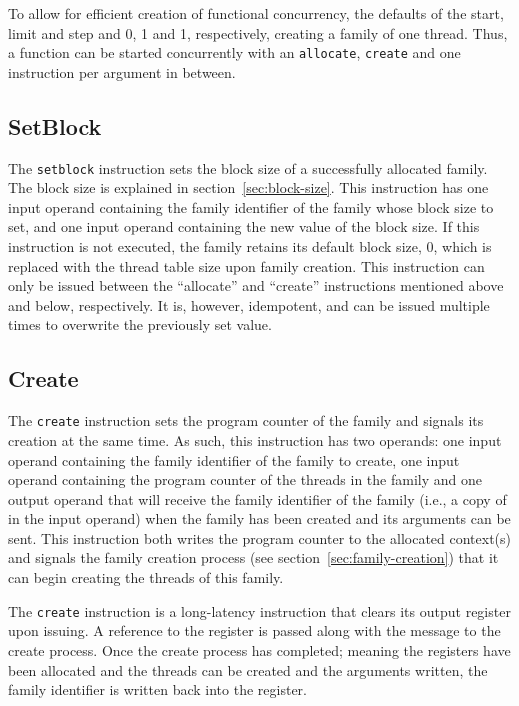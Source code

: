 To allow for efficient creation of functional concurrency, the defaults of the start, limit and step and 0, 1 and 1, respectively, creating a family of one thread. Thus, a function can be started  concurrently with an {\tt allocate}, {\tt create} and one instruction per argument in between.

\subsection{\label{sec:setblock}SetBlock}
The {\tt setblock} instruction sets the block size of a successfully allocated family. The block size is explained in section~\ref{sec:block-size}. This instruction has one input operand containing the family identifier of the family whose block size to set, and one input operand containing the new value of the block size. If this instruction is not executed, the family retains its default block size, 0, which is replaced with the thread table size upon family creation. This instruction can only be issued between the ``allocate'' and ``create'' instructions mentioned above and below, respectively. It is, however, idempotent, and can be issued multiple times to overwrite the previously set value.

\subsection{Create}
The {\tt create} instruction sets the program counter of the family and signals its creation at the same time. As such, this instruction has two operands: one input operand containing the family identifier of the family to create, one input operand containing the program counter of the threads in the family and one output operand that will receive the family identifier of the family (i.e., a copy of in the input operand) when the family has been created and its arguments can be sent. This instruction both writes the program counter to the allocated context(s) and signals the family creation process (see section~\ref{sec:family-creation}) that it can begin creating the threads of this family.

The {\tt create} instruction is a long-latency instruction that clears its output register upon issuing. A reference to the register is passed along with the message to the create process. Once the create process has completed; meaning the registers have been allocated and the threads can be created and the arguments written, the family identifier is written back into the register.


